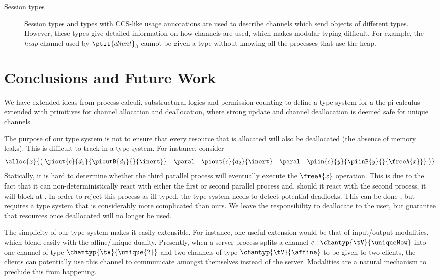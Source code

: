 \documentclass[copyright]{eptcs}
\begin{document}
\begin{description}
\item[Session types]

Session types \cite{Honda:SessionTypes} and types with CCS-like usage
annotations \cite{kobayashi:typesystems} are used to describe channels which
 send objects of different types. However, these types give 
detailed information on how channels are used, which makes modular typing
difficult. For example, the \textit{heap} channel used by $\ptit{client}_3$
cannot be given a type without knowing all the processes that use the heap. 

\end{description}

\section{Conclusions and Future Work}

We have extended ideas from process calculi, substructural logics and
permission counting to define a type system for a the pi-calculus extended with
primitives for channel allocation and deallocation, where strong update and
channel deallocation is deemed safe for unique channels. 

The purpose of our type system is not to ensure that every resource that is
allocated will also be deallocated (\ie the absence of memory leaks). This is difficult to track in a type
system. For instance, consider
\begin{equation*}
\alloc{x}{\bigl(\;\piout{c}{d_1}{\pioutB{d_1}{}{\inert}} \quad\paral\quad \piout{c}{d_2}{\inert} \quad \paral\quad \piin{c}{y}{\piinB{y}{}{\freeA{x}}}\;\bigr)} 
\end{equation*}
Statically, it is hard to determine whether the third parallel process will
eventually execute the $\freeA{x}$ operation.  This is due to the fact that it
can non-deterministically react with either the first or second parallel
process and, should it react with the second process, it will block at
.  In order to reject this process as ill-typed, the
type-system needs to detect potential deadlocks.  This can be done
\cite{kobayashi:2006}, but requires a type system that is considerably more
complicated than ours. We leave the responsibility to deallocate to the user,
but guarantee that resources once deallocated will no longer be used. 

The simplicity of our type-system makes it easily extensible.  For instance,
one useful extension would be that of input/output modalities, which blend
easily with the affine/unique duality.  Presently,   when a server process
splits a channel $c : \chantyp{\tV}{\uniqueNow}$ into one channel of type
$\chantyp{\tV}{\unique{2}}$ and two channels of type $\chantyp{\tV}{\affine}$
to be given to two clients, the clients can potentially use this channel to
communicate amongst themselves instead of the server.  Modalities are a natural
mechanism  to preclude this from happening.
\end{document}
